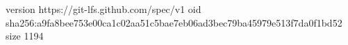version https://git-lfs.github.com/spec/v1
oid sha256:a9fa8bee753e00ca1c02aa51c5bae7eb06ad3bec79ba45979e513f7da0f1bd52
size 1194
